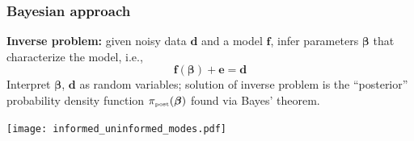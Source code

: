 \documentclass[10pt,final,xcolor=dvipsnames]{beamer}
\newcommand{\bs}[1]{\ensuremath{\boldsymbol{#1}}}
\begin{document}
\begin{frame}
  \frametitle{Bayesian approach} \textbf{Inverse problem:}
  given noisy data $\bs d$ and a model
  $\bs f$, infer parameters $\bs \beta$ that characterize the model, i.e.,
  \begin{equation*}
    \bs f(\bs \beta) + \bs e = \bs d
  \end{equation*}
  Interpret $\bs \beta$, $\bs d$ as random variables;
  solution of inverse problem is the ``posterior'' probability density function
  $\pi_{\mbox{\tiny post}}(\bs \beta)$ found via Bayes' theorem.\\
  \vspace{1em}
  \begin{center}
  	\texttt{[image: informed\_uninformed\_modes.pdf]}
  \end{center}
\end{frame}

%	
%	
\end{document}

